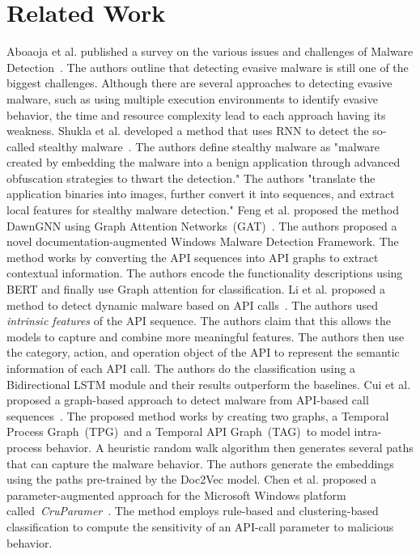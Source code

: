 \section{Related Work}
\label{sec:related_work}
Aboaoja et al. published a survey on the various issues and challenges of Malware Detection~\cite{aboaoja2022malware}. The authors outline that detecting evasive malware is still one of the biggest challenges. Although there are several approaches to detecting evasive malware, such as using multiple execution environments to identify evasive behavior, the time and resource complexity lead to each approach having its weakness.
Shukla et al. developed a method that uses RNN to detect the so-called stealthy malware~\cite{shukla2019stealthy}. The authors define stealthy malware as "malware created by embedding the malware into a benign application through advanced obfuscation strategies to thwart the detection." The authors "translate the application binaries into images, further convert it into sequences, and extract local features for stealthy malware detection."
Feng et al. proposed the method DawnGNN using Graph Attention Networks~(GAT)~\cite{feng2024dawngnn}. The authors proposed a novel documentation-augmented Windows Malware Detection Framework. The method works by converting the API sequences into API graphs to extract contextual information. The authors encode the functionality descriptions using BERT and finally use Graph attention for classification.
Li et al. proposed a method to detect dynamic malware based on API calls~\cite{li2022novel}. The authors used \textit{intrinsic features} of the API sequence. The authors claim that this allows the models to capture and combine more meaningful features. 
The authors then use the category, action, and operation object of the API to represent the semantic information of each API call. 
The authors do the classification using a Bidirectional LSTM module and their results outperform the baselines.
Cui et al. proposed a graph-based approach to detect malware from API-based call sequences~\cite{cui2023api2vec}. 
The proposed method works by creating two graphs, a Temporal Process Graph~(TPG)~and a Temporal API Graph~(TAG)~to model intra-process behavior. 
A heuristic random walk algorithm then generates several paths that can capture the malware behavior.
The authors generate the embeddings using the paths pre-trained by the Doc2Vec model.
Chen et al. proposed a parameter-augmented approach for the Microsoft Windows platform called~\textit{CruParamer}~\cite{chen2022cruparamer}. The method employs rule-based and clustering-based classification to compute the sensitivity of an API-call parameter to malicious behavior.
